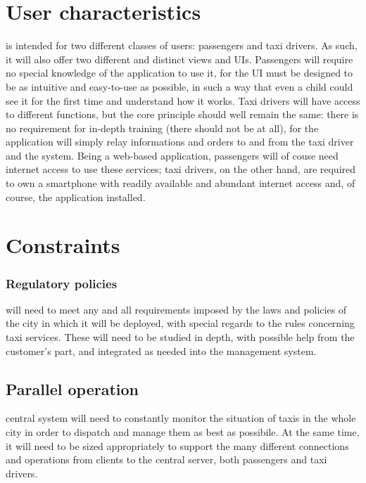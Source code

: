 \section{User characteristics}
\mts{} is intended for two different classes of users: passengers and taxi drivers. As such, it will also offer two different and distinct views and UIs. Passengers will require no special knowledge of the application to use it, for the UI must be designed to be as intuitive and easy-to-use as possible, in such a way that even a child could see it for the first time and understand how it works. Taxi drivers will have access to different functions, but the core principle should well remain the same: there is no requirement for in-depth training (there should not be at all), for the application will simply relay informations and  orders to and from the taxi driver and the system. Being a web-based application, passengers will of couse need internet access to use these services; taxi drivers, on the other hand, are required to own a smartphone with readily available and abundant internet access and, of course, the application installed.

\section{Constraints}
\subsubsection{Regulatory policies}
\mts{} will need to meet any and all requirements imposed by the laws and policies of the city in which it will be deployed, with special regards to the rules concerning taxi services. These will need to be studied in depth, with possible help from the customer's part, and integrated as needed into the management system.

\subsection{Parallel operation}
\mts{} central system will need to constantly monitor the situation of taxis in the whole city in order to dispatch and manage them as best as possibile. At the same time, it will need to be sized appropriately to support the many different connections and operations from clients to the central server, both passengers and taxi drivers.

